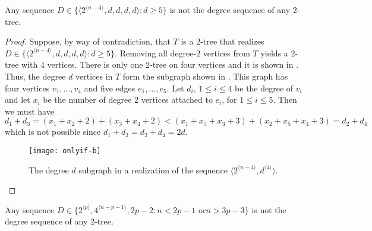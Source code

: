 \documentclass[lotsofwhite,charterfonts]{patmorin}
\newcommand{\rep}[1]{^{\langle#1\rangle}}
\begin{document}
\begin{lem}
Any sequence $D\in\{\langle 2\rep{n-4},d,d,d,d\rangle : d\ge 5\}$ is not 
the degree sequence of any 2-tree.
\end{lem}

\begin{proof}
Suppose, by way of contradiction, that $T$ is a 2-tree that realizes
$D\in\{\langle 2\rep{n-4},d,d,d,d\rangle : d\ge 5\}$.  Removing all
degree-2 vertices from $T$ yields a 2-tree with 4 vertices.  There
is only one 2-tree on four vertices and it is shown in
.  Thus, the degree $d$ vertices in $T$ form the
subgraph shown in .  
This graph has four vertices $v_1,\ldots,v_4$ and five edges
$e_1,\ldots,e_5$. Let $d_i$, $1\le i\le 4$ be the degree of $v_i$ and 
let $x_i$ be
the number of degree 2 vertices attached to $e_i$, for $1\le i\le 5$.
Then we must have
\[
   d_1+d_3 = (x_1 + x_2 + 2) + (x_3 + x_4 + 2)  <
   (x_1 + x_5 + x_3 + 3) + (x_2 + x_5 + x_4 + 3) = d_2 + d_4
\]
which is not possible since $d_1+d_3=d_2+d_4=2d$. 
\begin{figure}
\begin{center}
  \texttt{[image: onlyif-b]}
\end{center}
\caption{The degree $d$ subgraph in a realization of the sequence
$\langle 2\rep{n-4},d\rep{4}\rangle$.}
\end{figure}
\end{proof}


\begin{lem}
Any sequence $D\in\{2\rep{p},4\rep{n-p-1}, 2p-2 : \mbox{$n < 2p-1$ or
$n > 3p-3$} \}$ is not the degree sequence of any 2-tree.
\end{lem}
\end{document}

